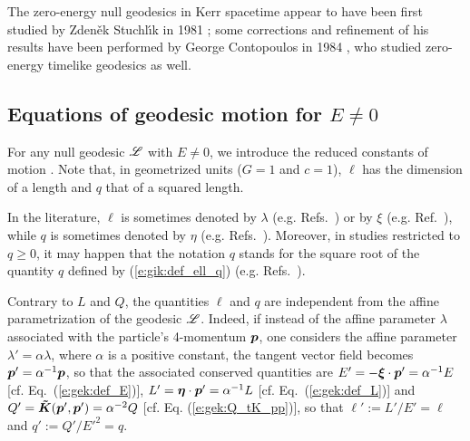 \begin{hist}
The zero-energy null geodesics in Kerr spacetime appear to have been first
studied by Zden\v{e}k Stuchl\'{\i}k in 1981
\cite{Stuch81}; some corrections and refinement of his results have been
performed by George Contopoulos in 1984 \cite{Conto84},
who studied zero-energy timelike geodesics as well.
\end{hist}

\subsection{Equations of geodesic motion for $E\neq 0$} \label{s:gik:eom_Enonzero}

For any null geodesic $\mathscr{L}$ with $E\neq 0$, we introduce the reduced constants of motion
\be \label{e:gik:def_ell_q}
     \qand
     .
\ee
Note that, in geometrized units ($G=1$ and $c=1$), $\ell$ has the dimension of
a length and $q$ that of a squared length.

\begin{remark}
In the literature, $\ell$ is sometimes denoted by $\lambda$ (e.g. Refs.~\cite{Barde73,GrallL20b,DokucN20a})
or by $\xi$ (e.g. Ref.~\cite{Chand83}), while $q$ is sometimes denoted by
$\eta$ (e.g. Refs.~\cite{Barde73,Chand83,GrallL20b}). Moreover, in studies restricted
to $q\geq 0$, it may happen that the notation $q$ stands for the square root of the quantity $q$ defined by
(\ref{e:gik:def_ell_q}) (e.g. Refs.~\cite{DexteA09,GrallLS18,DokucN20a}).
\end{remark}

\begin{remark} \label{r:gik:ell_q_intrinsic}
Contrary to $L$ and $Q$,
the quantities $\ell$ and $q$ are independent from the affine parametrization of the geodesic $\mathscr{L}$.
Indeed, if instead of the affine parameter $\lambda$ associated with the particle's 4-momentum $\bm{p}$,
one considers the affine parameter $\lambda' = \alpha \lambda$, where $\alpha$ is a positive constant,
the tangent vector field becomes
$\bm{p}' = \alpha^{-1} \bm{p}$, so that the associated conserved
quantities are $E' = - \bm{\xi}\cdot\bm{p}' = \alpha^{-1} E$ [cf. Eq.~(\ref{e:gek:def_E})], $L' = \bm{\eta}\cdot\bm{p}' = \alpha^{-1} L$ [cf. Eq.~(\ref{e:gek:def_L})]
and $Q' = \bm{\tilde K}(\bm{p}',\bm{p}') = \alpha^{-2} Q$ [cf. Eq. (\ref{e:gek:Q_tK_pp})],
so that $\ell' := L'/E' = \ell$ and $q' := Q'/{E'}^2 = q$.
\end{remark}

